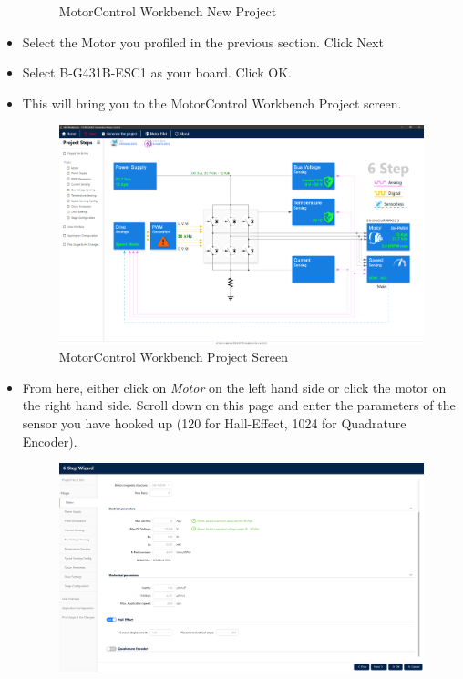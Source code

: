 \documentclass[10pt]{article}
\begin{document}
\begin{itemize}
\begin{figure}[H]
                        \caption{MotorControl Workbench New Project}
                    \end{figure}
                \item Select the Motor you profiled in the previous section. Click Next
                \item Select B-G431B-ESC1 as your board. Click OK.
                \item This will bring you to the MotorControl Workbench Project screen. 
                    \begin{figure}[H]
                        \centerline{\includegraphics[width=\textwidth]{References/MCW Project Screen.png}}
                        \caption{MotorControl Workbench Project Screen}
                    \end{figure}
                \item From here, either click on \emph{Motor} on the left hand side or click the motor on the right hand side. Scroll down on this page and enter the parameters of the sensor you have hooked up (120 for Hall-Effect, 1024 for Quadrature Encoder).
                    \begin{figure}[H]
                        \centerline{\includegraphics[width=\textwidth]{References/MCW 6-step Hall-Effect Motor.png}}

\end{figure}
\end{itemize}
\end{document}
